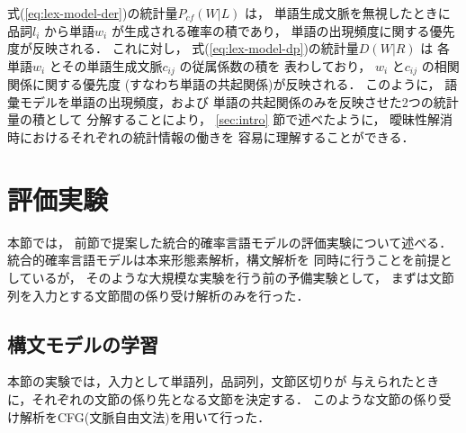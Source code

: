 式(\ref{eq:lex-model-der})の統計量$P_{cf}(W|L)$ は，
単語生成文脈を無視したときに
品詞$l_i$ から単語$w_i$ が生成される確率の積であり，
単語の出現頻度に関する優先度が反映される．
これに対し，
式(\ref{eq:lex-model-dp})の統計量$D(W|R)$ は
各単語$w_i$ とその単語生成文脈$c_{ij}$ の従属係数の積を
表わしており，
$w_i$ と$c_{ij}$ の相関関係に関する優先度
(すなわち単語の共起関係)が反映される．
このように，
語彙モデルを単語の出現頻度，および
単語の共起関係のみを反映させた2つの統計量の積として
分解することにより，
\ref{sec:intro} 節で述べたように，
曖昧性解消時におけるそれぞれの統計情報の働きを
容易に理解することができる．
\section{評価実験}
\label{sec:exp-stat}

本節では，
前節で提案した統合的確率言語モデルの評価実験について述べる．
統合的確率言語モデルは本来形態素解析，構文解析を
同時に行うことを前提としているが，
そのような大規模な実験を行う前の予備実験として，
まずは文節列を入力とする文節間の係り受け解析のみを行った．
\subsection{構文モデルの学習}
\label{sec:learn-syn-model}

本節の実験では，入力として単語列，品詞列，文節区切りが
与えられたときに，それぞれの文節の係り先となる文節を決定する．
このような文節の係り受け解析をCFG(文脈自由文法)を用いて行った．

